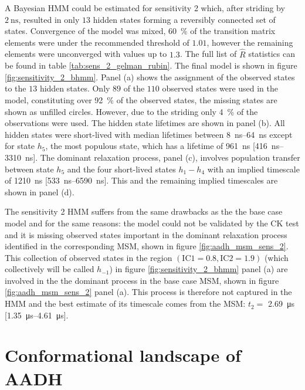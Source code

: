 A Bayesian HMM could be estimated for sensitivity 2 which, after striding by $\SI{2}{\nano\second}$, resulted in only $13$ hidden states forming a reversibly connected set of states. Convergence of the model was mixed, \SI{60}{\percent} of the transition matrix elements were under the recommended threshold of $1.01$,  however the remaining elements were unconverged with values up to $1.3$. The full list of $\hat{R}$ statistics can be found in table \ref{tab:sens_2_gelman_rubin}. The final model is shown in figure \ref{fig:sensitivity_2_bhmm}. Panel (a) shows the assignment of the observed states to the $13$ hidden states. Only $89$ of the $110$ observed states were used in the model, constituting over \SI{92}{\percent} of the observed states, the missing states are shown as unfilled circles. However, due to the striding only \SI{4}{\percent} of the observations were used. The hidden state lifetimes are shown in panel (b). All hidden states were short-lived with median lifetimes between \SIrange{8}{64}{\nano\second} except for state $h_5$, the most populous state, which has a lifetime of \SI{961}{\nano\second} [\SIrange[range-phrase=-]{416}{3310}{\nano\second}]. The dominant relaxation process, panel (c), involves population transfer between state $h_{5}$ and the four short-lived states $h_{1} - h_{4}$ with an implied timescale of \SI{1210}{\nano\second} [\SIrange[range-phrase=-]{533}{6590}{\nano\second}]. This and the remaining implied timescales are shown in panel (d). 

The sensitivity 2 HMM suffers from the same drawbacks as the the base case model and for the same reasons: the model could not be validated by the CK test and it is missing observed states important in the dominant relaxation process identified in the corresponding MSM, shown in figure \ref{fig:aadh_msm_sens_2}. This collection of observed states in the region $(\mathrm{IC 1}=0.8, \mathrm{IC 2}=1.9)$ (which collectively will be called $h_{-1}$) in figure \ref{fig:sensitivity_2_bhmm} panel (a) are involved in the the dominant process in the  base case MSM, shown in figure \ref{fig:aadh_msm_sens_2} panel (a). This process is therefore not captured in the HMM and the best estimate of its timescale comes from the MSM: $t_2 =$ \SI{2.69}{\micro\second} [\SIrange[range-phrase=-]{1.35}{4.61}{\micro\second}].

\section{Conformational landscape of AADH}\label{sec:aadh_landscape}

